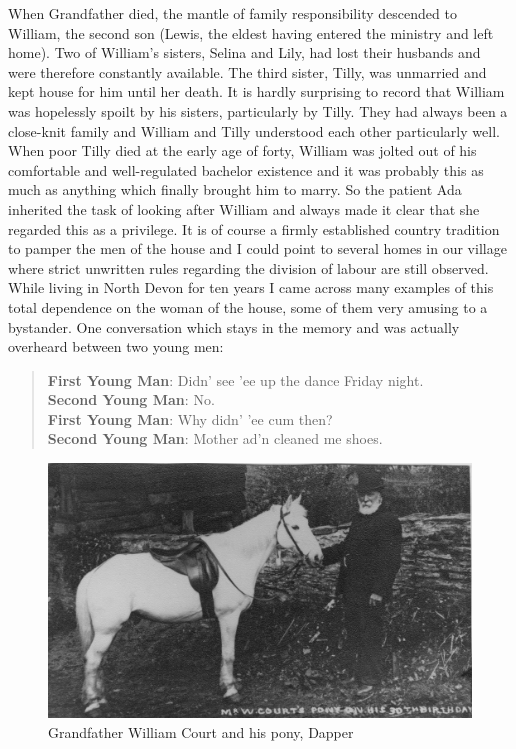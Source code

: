 When Grandfather died, the mantle of family responsibility descended to William, the second son (Lewis, the eldest having entered the ministry and left home). Two of William's sisters, Selina and Lily, had lost their husbands and were therefore constantly available. The third sister, Tilly, was unmarried and kept house for him until her death. It is hardly surprising to record that William was hopelessly spoilt by his sisters, particularly by Tilly. They had always been a close-knit family and William and Tilly understood each other particularly well. When poor Tilly died at the early age of forty, William was jolted out of his comfortable and well-regulated bachelor existence and it was probably this as much as anything which finally brought him to marry. So the patient Ada inherited the task of looking after William and always made it clear that she regarded this as a privilege. It is of course a firmly established country tradition to pamper the men of the house and I could point to several homes in our village where strict unwritten rules regarding the division of labour are still observed. While living in North Devon for ten years I came across many examples of this total dependence on the woman of the house, some of them very amusing to a bystander. One conversation which stays in the memory and was actually overheard between two young men:

\begin{quote}
\textbf{First Young Man}: Didn' see 'ee up the dance Friday night. \\
\textbf{Second Young Man}: No. \\ 
\textbf{First Young Man}: Why didn' 'ee cum then? \\
\textbf{Second Young Man}: Mother ad'n cleaned me shoes.
\end{quote}

\begin{figure}[]
	\centering
     \includegraphics[width=1\textwidth]{figures/DapperPony}
     \caption{Grandfather William Court and his pony, Dapper}
     \label{fig:Pony}
\end{figure}



